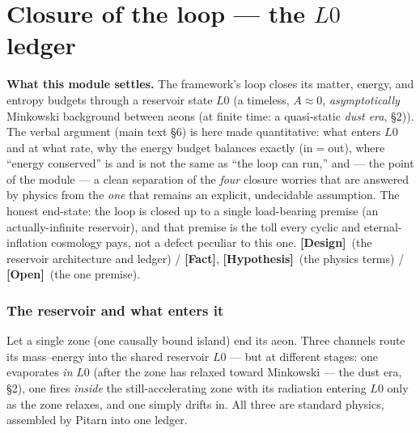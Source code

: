 \documentclass[11pt]{article}
\newcommand{\Fact}{\textbf{\textcolor{green!45!black}{[Fact]}}}
\newcommand{\Hyp}{\textbf{\textcolor{blue!55!black}{[Hypothesis]}}}
\newcommand{\Design}{\textbf{\textcolor{purple!65!black}{[Design]}}}
\newcommand{\Open}{\textbf{\textcolor{gray!10!black}{[Open]}}}
\begin{document}
\clearpage

\part{Closure of the loop --- the $L0$ ledger}
\setcounter{section}{0}\setcounter{equation}{0}\setcounter{figure}{0}

\noindent\textbf{What this module settles.} The framework's loop closes its matter, energy, and entropy budgets through a reservoir state $L0$ (a timeless, $A\!\approx\!0$, \emph{asymptotically} Minkowski background between aeons (at finite time: a quasi-static \emph{dust era}, \S2)). The verbal argument (main text \S6) is here made quantitative: what enters $L0$ and at what rate, why the energy budget balances exactly (in$=$out), where ``energy conserved'' is and is not the same as ``the loop can run,'' and --- the point of the module --- a clean separation of the \emph{four} closure worries that are answered by physics from the \emph{one} that remains an explicit, undecidable assumption. The honest end-state: the loop is closed up to a single load-bearing premise (an actually-infinite reservoir), and that premise is the toll every cyclic and eternal-inflation cosmology pays, not a defect peculiar to this one. \Design\ (the reservoir architecture and ledger) / \Fact, \Hyp\ (the physics terms) / \Open\ (the one premise).

\section{The reservoir and what enters it}
Let a single zone (one causally bound island) end its aeon. Three channels route its mass--energy into the shared reservoir $L0$ --- but at different stages: one evaporates \emph{in} $L0$ (after the zone has relaxed toward Minkowski --- the dust era, \S2), one fires \emph{inside} the still-accelerating zone with its radiation entering $L0$ only as the zone relaxes, and one simply drifts in. All three are standard physics, assembled by Pitarn into one ledger.
\end{document}
